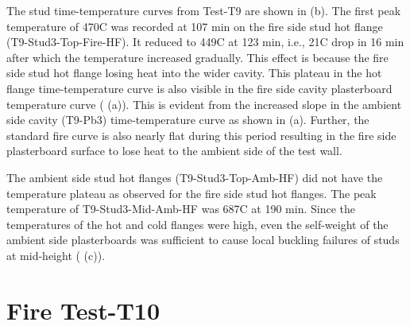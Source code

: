 The stud time-temperature curves from Test-T9 are shown in  (b). The first peak temperature of 470\degree C was recorded at 107 min on the fire side stud hot flange (T9-Stud3-Top-Fire-HF). It reduced to 449\degree C at 123 min, i.e., 21\degree C drop in 16 min after which the temperature increased gradually. This effect is because the fire side stud hot flange losing heat into the wider cavity. This plateau in the hot flange time-temperature curve is also visible in the fire side cavity plasterboard temperature curve ( (a)). This is evident from the increased slope in the ambient side cavity (T9-Pb3) time-temperature curve as shown in  (a). Further, the standard fire curve is also nearly flat during this period resulting in the fire side plasterboard surface to lose heat to the ambient side of the test wall.  

The ambient side stud hot flanges (T9-Stud3-Top-Amb-HF) did not have the temperature plateau as observed for the fire side stud hot flanges. The peak temperature of T9-Stud3-Mid-Amb-HF was 687\degree C at 190 min. Since the temperatures of the hot and cold flanges were high, even the self-weight of the ambient side plasterboards was sufficient to cause local buckling failures of studs at mid-height ( (c)).

\section{Fire Test-T10}

